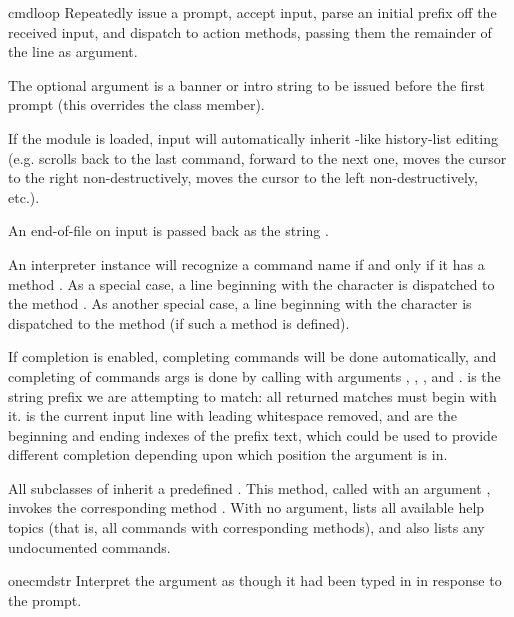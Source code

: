 \begin{methoddesc}{cmdloop}{}
Repeatedly issue a prompt, accept input, parse an initial prefix off
the received input, and dispatch to action methods, passing them the
remainder of the line as argument.

The optional argument is a banner or intro string to be issued before the
first prompt (this overrides the  class member).

If the  module is loaded, input will automatically
inherit -like history-list editing (e.g. 
scrolls back to the last command,  forward to the next
one,  moves the cursor to the right non-destructively,
 moves the cursor to the left non-destructively, etc.).

An end-of-file on input is passed back as the string .

An interpreter instance will recognize a command name  if
and only if it has a method .  As a special case,
a line beginning with the character  is dispatched to
the method .  As another special case, a line
beginning with the character \character{!} is dispatched to the
method  (if such a method is defined).

If completion is enabled, completing commands will be done
automatically, and completing of commands args is done by calling
 with arguments , ,
, and .   is the string prefix we
are attempting to match: all returned matches must begin with it.
 is the current input line with leading whitespace removed,
 and  are the beginning and ending indexes
of the prefix text, which could be used to provide different
completion depending upon which position the argument is in.

All subclasses of  inherit a predefined .
This method, called with an argument , invokes the
corresponding method .  With no argument,
 lists all available help topics (that is, all
commands with corresponding  methods), and also lists
any undocumented commands.
\end{methoddesc}

\begin{methoddesc}{onecmd}{str}
Interpret the argument as though it had been typed in in
response to the prompt.
\end{methoddesc}

